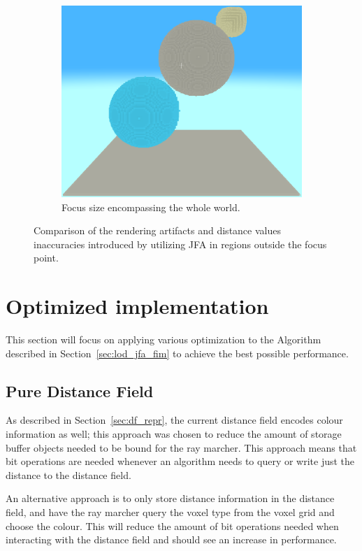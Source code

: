 \begin{figure}[htbp]
    \begin{subfigure}[t]{0.32\textwidth}
        \centering
        \includegraphics[width=\textwidth]{figures/hybrid_focus_3.png}
        \caption{Focus size encompassing the whole world.}
    \end{subfigure}
    \caption{Comparison of the rendering artifacts and distance values inaccuracies introduced by utilizing JFA in regions
        outside the focus point.}
    \label{fig:focus_size_artifacts}
\end{figure}

\section{Optimized implementation}
This section will focus on applying various optimization to the Algorithm described in Section~\ref{sec:lod_jfa_fim} to
achieve the best possible performance.

\subsection{Pure Distance Field}
As described in Section~\ref{sec:df_repr}, the current distance field encodes colour information as well; this approach
was chosen to reduce the amount of storage buffer objects needed to be bound for the ray marcher. This approach means
that bit operations are needed whenever an algorithm needs to query or write just the distance to the distance field.

An alternative approach is to only store distance information in the distance field, and have the ray marcher query the
voxel type from the voxel grid and choose the colour. This will reduce the amount of bit operations needed when
interacting with the distance field and should see an increase in performance.

